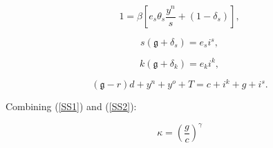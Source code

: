 \documentclass[11pt]{article}
\begin{document}
\begin{equation}
1=\beta \left[ e_{s}\theta _{s}\frac{y^{n}}{s}+(1-\delta _{s})\right] ,
\label{SS7}
\end{equation}

\begin{equation}
s(\mathfrak{g}+\delta _{s})=e_{s}i^{s},  \label{SS8}
\end{equation}

\begin{equation}
k(\mathfrak{g}+\delta _{k})=e_{k}i^{k},  \label{SS9}
\end{equation}

\begin{equation}
(\mathfrak{g}-r)d+y^{n}+y^{o}+T=c+i^{k}+g+i^{s}.  \label{SS10}
\end{equation}

Combining (\ref{SS1}) and (\ref{SS2}):

\begin{equation}
\kappa =\left( \frac{g}{c}\right) ^{\gamma }  \label{SS11}
\end{equation}
\end{document}
